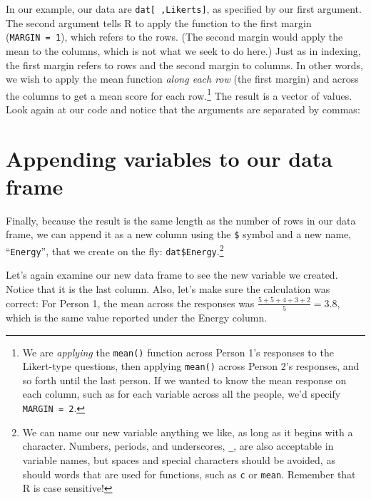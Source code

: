 \documentclass[
]{book}
\newenvironment{Shaded}{\begin{snugshade}}{\end{snugshade}}
\newcommand{\DecValTok}[1]{\textcolor[rgb]{0.00,0.00,0.81}{#1}}
\newcommand{\KeywordTok}[1]{\textcolor[rgb]{0.13,0.29,0.53}{\textbf{#1}}}
\newcommand{\NormalTok}[1]{#1}
\newcommand{\OperatorTok}[1]{\textcolor[rgb]{0.81,0.36,0.00}{\textbf{#1}}}
\newcommand{\StringTok}[1]{\textcolor[rgb]{0.31,0.60,0.02}{#1}}
\begin{document}
In our example, our data are \texttt{dat{[}\ ,Likerts{]}}, as specified by our first argument.\\
The second argument tells R to apply the function to the first margin (\texttt{MARGIN\ =\ 1}), which refers to the rows. (The second margin would apply the mean to the columns, which is not what we seek to do here.) Just as in indexing, the first margin refers to rows and the second margin to columns. In other words, we wish to apply the mean function \emph{along each row} (the first margin) and across the columns to get a mean score for each row.\footnote{We are \emph{applying} the \texttt{mean()} function across Person 1's responses to the Likert-type questions, then applying \texttt{mean()} across Person 2's responses, and so forth until the last person. If we wanted to know the mean response on each column, such as for each variable across all the people, we'd specify \texttt{MARGIN\ =\ 2}.} The result is a vector of values.\\
Look again at our code and notice that the arguments are separated by commas:

\begin{Shaded}
\end{Shaded}

\hypertarget{appending-variables-to-our-data-frame}{%
\section{Appending variables to our data frame}\label{appending-variables-to-our-data-frame}}

Finally, because the result is the same length as the number of rows in our data frame, we can append it as a new column using the \texttt{\$} symbol and a new name, ``\texttt{Energy}'', that we create on the fly: \texttt{dat\$Energy}.\footnote{We can name our new variable anything we like, as long as it begins with a character. Numbers, periods, and underscores, \texttt{\_}, are also acceptable in variable names, but spaces and special characters should be avoided, as should words that are used for functions, such as \texttt{c} or \texttt{mean}. Remember that R is case sensitive!}

Let's again examine our new data frame to see the new variable we created. Notice that it is the last column. Also, let's make sure the calculation was correct: For Person 1, the mean across the responses was \(\frac{5+5+4+3+2}{5}=3.8\), which is the same value reported under the Energy column.
\end{document}
